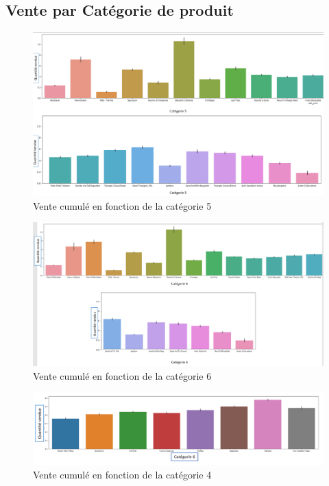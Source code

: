 \documentclass{article} %
\begin{document}
\subsection{Vente par Catégorie de produit}
\label{sec:catprod}
\begin{figure}[!h]
	\centering
	\includegraphics[keepaspectratio = true,scale=0.65]{categorie.png}
	\caption{Vente cumulé en fonction de la catégorie 5}
\end{figure}

\begin{figure}[!h]
	\centering 
	\includegraphics[keepaspectratio = true,scale=0.55]{categorie6.png}
	\caption{Vente cumulé en fonction de la catégorie 6}
	\label{bb3}
\end{figure}
\newpage
\begin{figure}[!h]
	\centering
	\includegraphics[keepaspectratio = true,scale=0.55]{categorie4.png}
	\caption{Vente cumulé en fonction de la catégorie 4}
	\label{bb3}
\end{figure}
\end{document}
